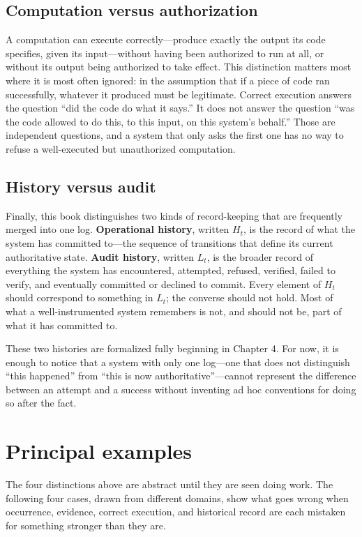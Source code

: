 \documentclass[11pt,openany]{book}
\begin{document}
\subsection{Computation versus authorization}

A computation can execute correctly---produce exactly the output its code
specifies, given its input---without having been authorized to run at all, or
without its output being authorized to take effect. This distinction matters
most where it is most often ignored: in the assumption that if a piece of code
ran successfully, whatever it produced must be legitimate. Correct execution
answers the question ``did the code do what it says.'' It does not answer the
question ``was the code allowed to do this, to this input, on this system's
behalf.'' Those are independent questions, and a system that only asks the
first one has no way to refuse a well-executed but unauthorized computation.

\subsection{History versus audit}

Finally, this book distinguishes two kinds of record-keeping that are
frequently merged into one log. \textbf{Operational history}, written
\(H_t\), is the record of what the system has committed to---the sequence of
transitions that define its current authoritative state. \textbf{Audit
history}, written \(L_t\), is the broader record of everything the system has
encountered, attempted, refused, verified, failed to verify, and eventually
committed or declined to commit. Every element of \(H_t\) should correspond to
something in \(L_t\); the converse should not hold. Most of what a
well-instrumented system remembers is not, and should not be, part of what it
has committed to.

These two histories are formalized fully beginning in Chapter 4. For now, it
is enough to notice that a system with only one log---one that does not
distinguish ``this happened'' from ``this is now authoritative''---cannot
represent the difference between an attempt and a success without inventing ad
hoc conventions for doing so after the fact.

\section{Principal examples}

The four distinctions above are abstract until they are seen doing work. The
following four cases, drawn from different domains, show what goes wrong when
occurrence, evidence, correct execution, and historical record are each
mistaken for something stronger than they are.
\end{document}
